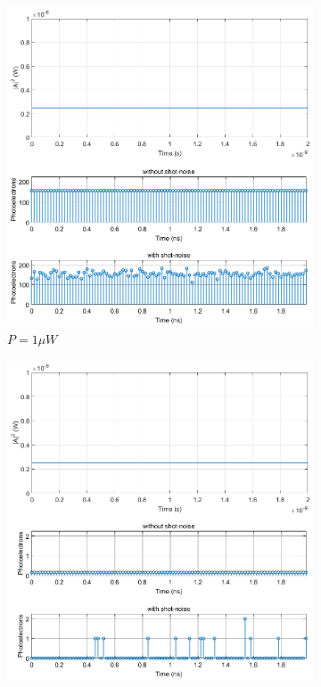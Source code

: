 \begin{refsection}
\begin{figure}[H]
	\centering
	\begin{subfigure}{0.45\textwidth}
		\includegraphics[width=\textwidth]{./lib/photoelectron_generator/figures/plot-constant-1uW}
		\caption{$P=1 \mu W$}
	\end{subfigure}
	\hspace{10mm}
	\begin{subfigure}{0.45\textwidth}
		\includegraphics[width=\textwidth]{./lib/photoelectron_generator/figures/plot-constant-1nW}

\end{subfigure}
\end{figure}
\end{refsection}
